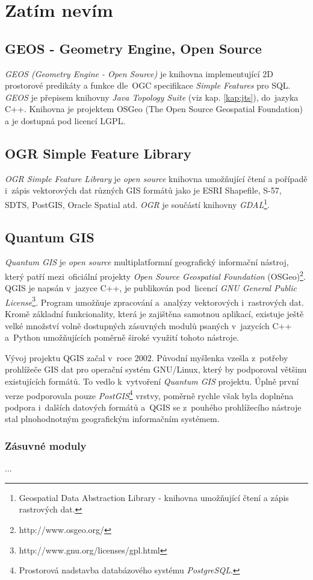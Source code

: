 \chapter{Zatím nevím}
\label{4-nevim}

\section{GEOS - Geometry Engine, Open Source}
\label{geos}

\textit{GEOS (Geometry Engine - Open Source)} je knihovna implementující 2D prostorové predikáty a funkce dle~OGC specifikace \textit{Simple Features} pro SQL. \textit{GEOS}
je přepisem knihovny \textit{Java Topology Suite} (viz kap. \ref{kap:jts}), do~jazyka C++. Knihovna je projektem OSGeo (The Open Source Geospatial Foundation) a je
dostupná pod licencí LGPL.

\section{OGR Simple Feature Library}
\label{ogr}

\textit{OGR Simple Feature Library} je \textit{open source} knihovna umožňující čtení a pořípadě i~zápis vektorových dat různých GIS formátů jako je ESRI Shapefile, S-57, SDTS, 
PostGIS, Oracle Spatial atd. \textit{OGR} je součástí knihovny \textit{GDAL}\footnote{Geospatial Data Abstraction Library - knihovna umožňující čtení a zápis rastrových dat.}.

\section{Quantum GIS}
\label{qgis}

\textit{Quantum GIS} je \textit{open source} multiplatformní geografický informační nástroj, který patří mezi~oficiální projekty \textit{Open Source Geospatial Foundation} 
(OSGeo)\footnote{http://www.osgeo.org/}. QGIS je napsán v~jazyce C++, je publikován pod~licencí \textit{GNU General Public License}\footnote{http://www.gnu.org/licenses/gpl.html}. Program umožňuje zpracování a~analýzy vektorových i~rastrových dat. Kromě základní funkcionality, která je zajištěna samotnou aplikací, existuje ještě 
velké množství volně dostupných zásuvných modulů psaných v~jazycích C++ a~Python umožňujících poměrně široké využití tohoto nástroje. %

Vývoj projektu QGIS začal v~roce 2002. Původní myšlenka vzešla z~potřeby prohlížeče GIS dat pro operační systém GNU/Linux, který by podporoval většinu existujících formátů. To vedlo k~vytvoření 
\textit{Quantum GIS} projektu. Úplně první verze podporovala pouze \textit{PostGIS}\footnote{Prostorová nadstavba databázového systému \textit{PostgreSQL}.} vrstvy, poměrně 
rychle však byla doplněna podpora i~dalších datových formátů a~QGIS se z~pouhého prohlížecího nástroje stal plnohodnotným geografickým informačním systémem.


\subsection{Zásuvné moduly}
\label{qgis plugins}
...
